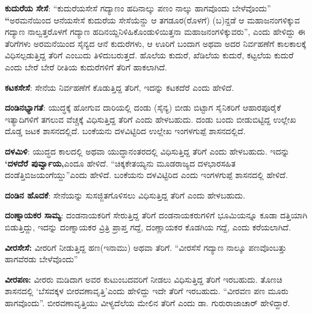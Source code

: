\textbf{ಕುದುರೆಯ ಸೇಸೆ}: “ಕುದುರೆಯಸೇಸೆ ಗದ್ಯಾಣಂ ಹದಿನಾಲ್ಕು ಪಣಂ ನಾಲ್ಕು ಹಾಗವೊಂದು ಬೇಳೆವೊಂದು” \textbf{“}ಅರಮನೆಯಿಂದ ಆನೆಯಸೇಸೆ ಕುದುರೆಯ ಸೇಸೆಯೆನ್ದು ಆ ತಗಡೂರ(ರೊಳಗೆ) (ಬ)ನ್ದಡೆ ಆ ಮಹಾಜನಂಗಳಿಕ್ಕುವ ಗದ್ಯಾಣ ನಾಲ್ವತ್ತರೊಳಗೆ ಗದ್ಯಾಣ ಹದಿನಯ್ದನಿಳಿಹಿಕೊಂಡುಳಿಯಿತ್ತನಾ ಮಹಾಜನಂಗಳಿಕ್ಕುವರು”, ಎಂದು ಹೇಳಿದ್ದು ಈ ತೆರಿಗೆಗಳು ಅರಮನೆಯಿಂದ ಸೈನ್ಯದ ಆನೆ ಕುದುರೆಗಳು, ಆ ಊರಿಗೆ ಬಂದಾಗ ಅಥವಾ ಅದರ ನಿರ್ವಹಣೆಗೆ ಕಾಲಕಾಲಕ್ಕೆ ವಿಧಿಸಲ್ಪಡುತ್ತಿದ್ದ ತೆರಿಗೆ ಎಂಬುದು ತಿಳಿದುಬರುತ್ತದೆ. ಹೊಲೆಯ ಕುದುರೆ, ಖೆಡಿಲೆಯ ಕುದುರೆ, ಕಟ್ಟಲೆಯ ಕುದುರೆ ಎಂದು ಬೇರೆ ಬೇರೆ ರೀತಿಯ ಕುದುರೆಗಳಿಗೆ ತೆರಿಗೆ ಹಾಕಲಾಗಿದೆ.

\textbf{ಕಟಕಸೇಸೆ}: ಸೇನೆಯ ನಿರ್ವಹಣೆಗೆ ಕೊಡುತ್ತಿದ್ದ ತೆರಿಗೆ, ಇದನ್ನು ಕಟಕದೆರೆ ಎಂದು ಹೇಳಿದೆ.

\textbf{ದಂಡಿನಭ್ಯಾಗತೆ}: ಯುದ್ಧಕ್ಕೆ ಹೋಗುವ ದಾರಿಯಲ್ಲಿ ದಂಡು (ಸೈನ್ಯ) ಬೀಡು ಬಿಟ್ಟಾಗ ಸೈನಿಕರಿಗೆ ಆಹಾರಪೂರೈಕೆ ಇತ್ಯಾದಿಗಳಿಗೆ ತಗಲುವ ವೆಚ್ಚಕ್ಕೆ ವಿಧಿಸುತ್ತಿದ್ದ ತೆರಿಗೆ ಎಂದು ಹೇಳಬಹುದು. ದಂಡು ಬಂದು ಬೀಡುಬಿಟ್ಟಿದ್ದ ಉಲ್ಲೇಖ ದೊಡ್ಡ ಜಟಕ ಶಾಸನದಲ್ಲಿದೆ. ಬಂಕೆಯನು ದಳವಿಟ್ಟಿರಿದ ಉಲ್ಲೇಖ ಇಂಗಳಗುಪ್ಪೆ ಶಾಸನದಲ್ಲಿದೆ. 

\textbf{ದಳಮಿಳಿ}: ಯುದ್ಧದ ಕಾಲದಲ್ಲಿ ಅಥವಾ ಯುದ್ಧಾನಂತರದಲ್ಲಿ ವಿಧಿಸುತ್ತಿದ್ದ ತೆರಿಗೆ ಎಂದು ಹೇಳಬಹುದು. ಇದನ್ನು \textbf{‘ದಳದೆರೆ ಪುರ್ವ್ವಾಯ,}ಎಂದೂ ಹೇಳಿದೆ. “ಚಿಕ್ಕಕೇತಯ್ಯನು ಮೂಡರಾಜ್ಯದ ದಳಭಾರಸಹಿತ ದಂಡೆತ್ತಿ\break ಬಿಜಯಂಗೆಯ್ದು”ಎಂದು ಹೇಳಿದೆ. ಬಂಕೆಯನು ದಳವಿಟ್ಟಿರಿದ ಎಂದು ಇಂಗಳಗುಪ್ಪೆ ಶಾಸನದಲ್ಲಿ ಹೇಳಿದೆ.

\textbf{ದಂಡಿನ ಹೊದಕೆ}: ಸೇನೆಯನ್ನು ಸುಸಜ್ಜಿತಗೊಳಿಸಲು ವಿಧಿಸುತ್ತಿದ್ದ ತೆರಿಗೆ ಎಂದು ಹೇಳಬಹುದು.

\textbf{ದಂಣ್ನಾಯಕರ ಸಾಮ್ಯ}: ದಂಡನಾಯಕರಿಗೆ ಸೇರುತ್ತಿದ್ದ ತೆರಿಗೆ ದಂಡನಾಯಕರುಗಳಿಗೆ ಭೂಮಿಯನ್ನೂ ಕೂಡಾ ದತ್ತಿಯಾಗಿ ಬಿಡುತ್ತಿದ್ದು, ಇದನ್ನು ದಂಣ್ನಾಯಕರ ವ್ರಿತ್ರಿ ಪ್ರಾಪ್ತ ಗದ್ದೆ, ದಂಣ್ಣಾಯಕರ ಕೊಡಗಿಯ ಗದ್ದೆ, ಎಂದು ಕರೆಯಲಾಗಿದೆ.

\textbf{ವೀರಸೇಸೆ:} ವೀರರಿಗೆ ನೀಡುತ್ತಿದ್ದ ಹಣ(ಇನಾಮು) ಅಥವಾ ತೆರಿಗೆ. “ವೀರಸೆಸೆ ಗದ್ಯಾಣ ನಾಲ್ಕೂ ಪಣವೊಂಬತ್ತು ಹಾಗವೆರಡು ಬೇಳೆವೊಂದು”

\textbf{ವೀರಪಣ: } ವೀರರು ಮಡಿದಾಗ ಅವರ ಕುಟುಂಬದವರಿಗೆ ನೀಡಲು ವಿಧಿಸುತ್ತಿದ್ದ ತೆರಿಗೆ ಇರಬಹುದು. ತೊಣಚಿ ಶಾಸನದಲ್ಲಿ ‘ಬೆಸವಕ್ಕಳ ಬೀರವಣಾವೃತ್ತಿ’ಎಂದು ಹೇಳಿದ್ದು ಇದೇ ತೆರಿಗೆ ಇರಬಹುದು. “ವೀರವಣ ಪಣ ಮೂರು ಹಾಗವೊಂದು”. ಬೀರವಣಾವೃತ್ತಿಯು ವೀಳ್ಯದೆಲೆಯ ಮೇಲಿನ ತೆರಿಗೆ ಎಂದು ಡಾ. ಗುರುರಾಜಾಚಾರ್​ ಹೇಳಿದ್ದಾರೆ.


